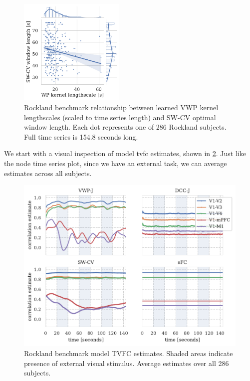\begin{figure}[t]
  \centering
  \includegraphics[width=0.45\textwidth]{fig/rockland/CHECKERBOARD645/lengthscale_optimal_window_length_relations}
  \caption{
    Rockland benchmark relationship between learned VWP kernel lengthscales (scaled to time series length) and SW-CV optimal window length.
    Each dot represents one of 286 Rockland subjects.
    Full time series is 154.8 seconds long.
  }\label{fig:rockland-relationship-lengthscale-optimal-window-length}
\end{figure}


We start with a visual inspection of model \gls{tvfc} estimates, shown in \cref{fig:rockland-results-tvfc-predictions}.
Just like the node time series plot, since we have an external task, we can average estimates across all subjects.


\begin{figure}[ht]
  \centering
  \includegraphics[width=\textwidth]{fig/rockland/CHECKERBOARD645/TVFC_predictions/all_subjects_joint_correlations}
  \caption{
    Rockland benchmark model TVFC estimates.
    Shaded areas indicate presence of external visual stimulus.
    Average estimates over all 286 subjects.
  }\label{fig:rockland-results-tvfc-predictions}
\end{figure}



